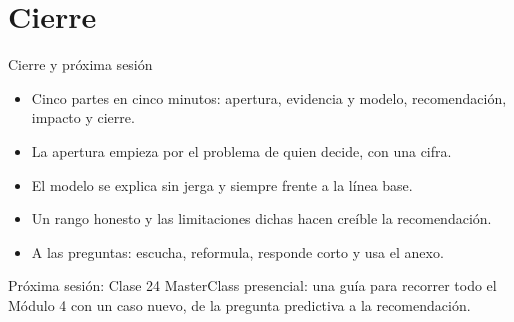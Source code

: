 \documentclass[aspectratio=169,11pt]{beamer}
\begin{document}
\section{Cierre}
\begin{frame}[t]{Cierre y próxima sesión}
  \begin{itemize}
    \small
    \item Cinco partes en cinco minutos: apertura, evidencia y modelo,
      recomendación, impacto y cierre.
    \item La apertura empieza por el problema de quien decide, con una
      cifra.
    \item El modelo se explica sin jerga y siempre frente a la línea base.
    \item Un rango honesto y las limitaciones dichas hacen creíble la
      recomendación.
    \item A las preguntas: escucha, reformula, responde corto y usa el anexo.
  \end{itemize}
  \vspace{0.15cm}
  \begin{block}{Próxima sesión: Clase 24}
    \small MasterClass presencial: una guía para recorrer todo el Módulo 4
    con un caso nuevo, de la pregunta predictiva a la recomendación.
  \end{block}
\end{frame}

{
\begin{frame}
\end{frame}
}
\end{document}

